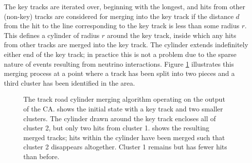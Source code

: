The key tracks are iterated over, beginning with the longest, and hits from other (non-key) tracks are considered for merging into the key track if the distance $d$ from the hit to the line corresponding to the key track is less than some radius $r$. This defines a cylinder of radius $r$ around the key track, inside which any hits from other tracks are merged into the key track. The cylinder extends indefinitely either end of the key track; in practice this is not a problem due to the sparse nature of events resulting from neutrino interactions. Figure \ref{fig:ca_merging_cylinder} illustrates this merging process at a point where a track has been split into two pieces and a third cluster has been identified in the area.

\begin{figure}
\centering
{}
\caption[Track road merging algorithm operating on CA output]{\label{fig:ca_merging_cylinder}The track road cylinder merging algorithm operating on the output of the \ac{CA}.  shows the initial state with a key track and two smaller clusters. The cylinder drawn around the key track encloses all of cluster 2, but only two hits from cluster 1.  shows the resulting merged tracks; hits within the cylinder have been merged such that cluster 2 disappears altogether. Cluster 1 remains but has fewer hits than before.}
\end{figure}

